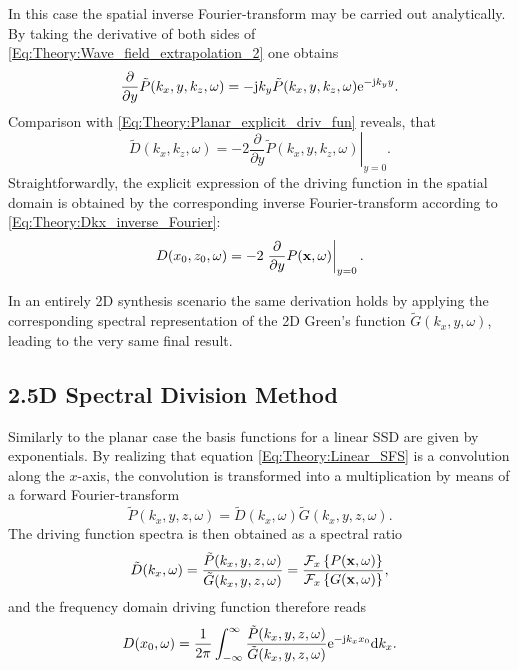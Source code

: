 \vspace{3mm}
In this case the spatial inverse Fourier-transform may be carried out analytically.
By taking the derivative of both sides of \eqref{Eq:Theory:Wave_field_extrapolation_2} one obtains
\begin{equation}
\frac{\partial}{\partial y}  \tilde{P}(k_x,y,k_z,\omega) = - \mathrm{j} k_y  \tilde{P}(k_x,y,k_z,\omega) \mathrm{e}^{-\mathrm{j} k_y y}.
\end{equation}
Comparison with \eqref{Eq:Theory:Planar_explicit_driv_fun} reveals, that 
\begin{equation}
\tilde{D}(k_x,k_z,\omega) = -2 \left. \frac{\partial}{\partial y} \tilde{P}(k_x,y,k_z,\omega) \right|_{y = 0}.
\label{Eq:Theory:Planar_explicit_driv_fun_spatial}
\end{equation}
Straightforwardly, the explicit expression of the driving function in the spatial domain is obtained by the corresponding inverse Fourier-transform according to \eqref{Eq:Theory:Dkx_inverse_Fourier}:
\begin{equation}
D(x_0,z_0,\omega) = -2 \left. \frac{\partial}{\partial y} P(\mathbf{x},\omega) \right|_{y = 0}.
\label{Eq:Theory:Planar_explicit_driv_fun_spatial}
\end{equation}

In an entirely 2D synthesis scenario the same derivation holds by applying the corresponding spectral representation of the 2D Green's function $\tilde{G}(k_x,y,\omega)$, leading to the very same final result.
 
 
\subsection{2.5D Spectral Division Method}

Similarly to the planar case the basis functions for a linear SSD are given by exponentials.
By realizing that equation \eqref{Eq:Theory:Linear_SFS} is a convolution along the $x$-axis,
the convolution is transformed into a multiplication by means of a forward Fourier-transform
\begin{equation}
\tilde{P}(k_x,y,z, \omega) = \tilde{D}(k_x,\omega)\tilde{G}(k_x,y,z, \omega).
\end{equation}
The driving function spectra is then obtained as a spectral ratio
\begin{equation}
\tilde{D}(k_x,\omega) = \frac{\tilde{P}(k_x,y,z, \omega)}{\tilde{G}(k_x,y,z, \omega)} = \frac{\mathcal{F}_x\left\{ P(\mathbf{x},\omega) \right\}}{\mathcal{F}_x\left\{ G(\mathbf{x},\omega) \right\}},
\end{equation}
and the frequency domain driving function therefore reads
\begin{equation}
D(x_0,\omega) = \frac{1}{2\pi} \int_{-\infty}^{\infty} \frac{\tilde{P}(k_x,y,z, \omega) }{\tilde{G}(k_x,y,z, \omega)} \mathrm{e}^{-\mathrm{j} k_x x_0} \mathrm{d} k_x.
\label{Eq:Theory:LinearSDM1}
\end{equation}

